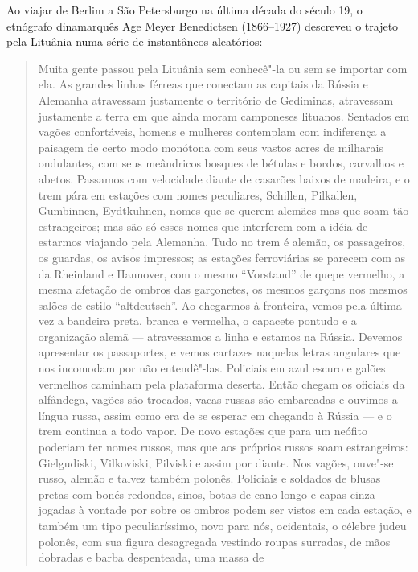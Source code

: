 \asterisc

Ao viajar de Berlim a São Petersburgo na última década do século 19, o
etnógrafo dinamarquês Age Meyer Benedictsen (1866--1927) descreveu o
trajeto pela Lituânia numa série de instantâneos aleatórios:

%

\begin{quote}
Muita gente passou pela Lituânia sem conhecê"-la ou sem se importar com
ela. As grandes linhas férreas que conectam as capitais da Rússia e
Alemanha atravessam justamente o território de Gediminas, atravessam
justamente a terra em que ainda moram camponeses lituanos. Sentados em
vagões confortáveis, homens e mulheres contemplam com indiferença a
paisagem de certo modo monótona com seus vastos acres de milharais
ondulantes, com seus meândricos bosques de bétulas e bordos, carvalhos e
abetos. Passamos com velocidade diante de casarões baixos de madeira, e
o trem pára em estações com nomes peculiares, Schillen, Pilkallen,
Gumbinnen, Eydtkuhnen, nomes que se querem alemães mas que soam tão
estrangeiros; mas são só esses nomes que interferem com a idéia de
estarmos viajando pela Alemanha. Tudo no trem é alemão, os passageiros,
os guardas, os avisos impressos; as estações ferroviárias se parecem com
as da Rheinland e Hannover, com o mesmo ``Vorstand'' de quepe vermelho,
a mesma afetação de ombros das garçonetes, os mesmos garçons nos mesmos
salões de estilo ``altdeutsch''. Ao chegarmos à fronteira, vemos pela
última vez a bandeira preta, branca e vermelha, o capacete pontudo e a
organização alemã --- atravessamos a linha e estamos na Rússia. Devemos
apresentar os passaportes, e vemos cartazes naquelas letras angulares
que nos incomodam por não entendê"-las. Policiais em azul escuro e galões
vermelhos caminham pela plataforma deserta. Então chegam os oficiais da
alfândega, vagões são trocados, vacas russas são embarcadas e ouvimos a
língua russa, assim como era de se esperar em chegando à Rússia --- e o
trem continua a todo vapor. De novo estações que para um neófito
poderiam ter nomes russos, mas que aos próprios russos soam
estrangeiros: Gielgudiski, Vilkoviski, Pilviski e assim por diante. Nos
vagões, ouve"-se russo, alemão e talvez também polonês. Policiais e
soldados de blusas pretas com bonés redondos, sinos, botas de cano longo
e capas cinza jogadas à vontade por sobre os ombros podem ser vistos em
cada estação, e também um tipo peculiaríssimo, novo para nós,
ocidentais, o célebre judeu polonês, com sua figura desagregada vestindo
roupas surradas, de mãos dobradas e barba despenteada, uma massa de

\end{quote}
